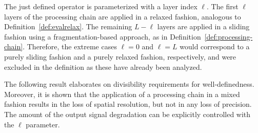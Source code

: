 \documentclass[journal]{IEEEtran}
\begin{document}
The just defined operator is parameterized with a layer index $\ell$.
The first $\ell$ layers of the processing chain are applied in a relaxed fashion, analogous to Definition~\ref{def:evalrelax}.
The remaining $L - \ell$ layers are applied in a sliding fashion using a fragmentation-based approach, as in Definition~\ref{def:processing-chain}.
Therefore, the extreme cases $\ell = 0$ and $\ell = L$ would correspond to a purely sliding fashion and a purely relaxed fashion, respectively, and were excluded in the definition as these have already been analyzed.

The following result elaborates on divisibility requirements for well-definedness.
Moreover, it is shown that the application of a processing chain in a mixed fashion results in the loss of spatial resolution, but not in any loss of precision.
The amount of the output signal degradation can be explicitly controlled with the $\ell$ parameter.
\end{document}

